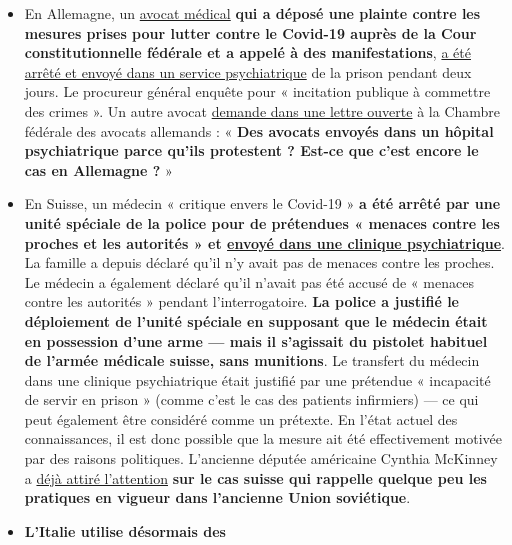 \begin{itemize}
\tightlist
\item
  En Allemagne, un \href{http://beatebahner.de/}{avocat médical}
  \textbf{qui a déposé une plainte contre les mesures prises pour lutter
  contre le Covid-19 auprès de la Cour constitutionnelle fédérale et a
  appelé à des manifestations},
  \href{https://www.rnz.de/nachrichten/heidelberg_artikel,-nach-aufruf-zu-corona-demo-heidelberger-anwaeltin-in-psychiatrischer-einrichtung-update-_arid,508747.html}{a
  été arrêté et envoyé dans un service psychiatrique} de la prison
  pendant deux jours. Le procureur général enquête pour « incitation
  publique à commettre des crimes ». Un autre avocat
  \href{https://www.nachrichtenspiegel.de/2020/04/14/brief-an-die-bundesrechtsanwaltskammer-in-causa-bahmer/}{demande
  dans une lettre ouverte} à la Chambre fédérale des avocats allemands :
  « \textbf{Des avocats envoyés dans un hôpital psychiatrique parce
  qu'ils protestent ? Est-ce que c'est encore le cas en Allemagne ?} »
\item
  En Suisse, un médecin « critique envers le Covid-19 » \textbf{a été
  arrêté par une unité spéciale de la police pour de prétendues «
  menaces contre les proches et les autorités » et
  \href{https://www.srf.ch/news/regional/aargau-solothurn/festnahme-von-corona-kritiker-verschwoerung-oder-normale-intervention-der-aargauer-behoerden}{envoyé
  dans une clinique psychiatrique}}. La famille a depuis déclaré qu'il
  n'y avait pas de menaces contre les proches. Le médecin a également
  déclaré qu'il n'avait pas été accusé de « menaces contre les autorités
  » pendant l'interrogatoire. \textbf{La police a justifié le
  déploiement de l'unité spéciale en supposant que le médecin était en
  possession d'une arme --- mais il s'agissait du pistolet habituel de
  l'armée médicale suisse, sans munitions}. Le transfert du médecin dans
  une clinique psychiatrique était justifié par une prétendue «
  incapacité de servir en prison » (comme c'est le cas des patients
  infirmiers) --- ce qui peut également être considéré comme un
  prétexte. En l'état actuel des connaissances, il est donc possible que
  la mesure ait été effectivement motivée par des raisons politiques.
  L'ancienne députée américaine Cynthia McKinney a
  \href{https://twitter.com/cynthiamckinney/status/1250075810838581248}{déjà
  attiré l'attention} \textbf{sur le cas suisse qui rappelle quelque peu
  les pratiques en vigueur dans l'ancienne Union soviétique}.
\item
  \textbf{L'Italie utilise désormais des}

\end{itemize}
